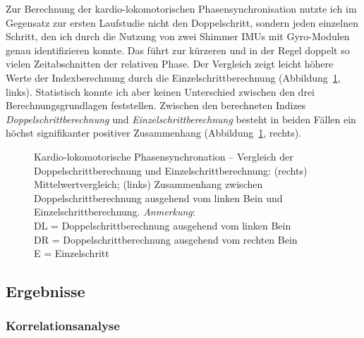 Zur Berechnung der kardio-lokomotorischen Phasensynchronisation nutzte ich im Gegensatz zur ersten Laufstudie nicht den Doppelschritt, sondern jeden einzelnen Schritt, den ich durch die Nutzung von zwei Shimmer \acp{IMU} mit Gyro-Modulen genau identifizieren konnte. Das führt zur kürzeren und in der Regel doppelt so vielen Zeitabschnitten der relativen Phase. Der Vergleich zeigt leicht höhere Werte der Indexberechnung durch die Einzelschrittberechnung (Abbildung~\ref{fig:index_vergleich}, links). Statistisch konnte ich aber keinen Unterschied zwischen den drei Berechnungsgrundlagen feststellen. Zwischen den berechneten Indizes \emph{Doppelschrittberechnung} und \emph{Einzelschrittberechnung} besteht in beiden Fällen ein höchst signifikanter positiver Zusammenhang (Abbildung~\ref{fig:index_vergleich}, rechts). 
\begin{figure}
	[!htb]  \caption[Kardio-lokomotorische Phasensynchronation: Vergleich der Doppelschrittberechnung und Einzelschrittberechnung]{Kardio-lokomotorische Phasensynchronation -- Vergleich der Doppelschrittberechnung und Einzelschrittberechnung: (rechts) Mittelwertvergleich; (links) Zusammenhang zwischen Doppelschrittberechnung ausgehend vom linken Bein und Einzelschrittberechnung. \emph{Anmerkung}: \\
	\hspace{
	\textwidth}DL = Doppelschrittberechnung ausgehend vom linken Bein \\
	\hspace{
	\textwidth}DR = Doppelschrittberechnung ausgehend vom rechten Bein \\
	\hspace{
	\textwidth}E = Einzelschritt} \label{fig:index_vergleich} 
\end{figure}

\subsection{Ergebnisse} 

\label{sub:ergebnisse_5_3}

\subsubsection{Korrelationsanalyse} 

\label{ssub:korrelationsanalyse_5_3}

